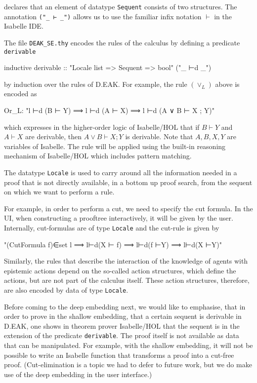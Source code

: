 \documentclass[runningheads,a4paper]{llncs}
\begin{document}
\noindent declares that an element of datatype \texttt{Sequent} consists of two structures. The annotation \texttt{("\_ ⊢ \_")} allows us to use the familiar infix notation $\vdash$ in the Isabelle IDE. 

The file \texttt{DEAK\_SE.thy} encodes the rules of the calculus by defining a predicate \texttt{derivable}

\begin{pyglist}[language = isabelle]
inductive derivable :: "Locale list => Sequent => bool"  ("_ ⊢d _")
\end{pyglist}
\noindent by induction over the rules of D.EAK. For example, the rule $(\vee_L)$ above is encoded as

\begin{pyglist}[language = isabelle]
Or_L:  "l ⊢d (B ⊢ Y) ⟹ l ⊢d (A ⊢ X) ⟹ l ⊢d (A ∨ B ⊢ X ; Y)"
\end{pyglist}
\noindent which expresses in the higher-order logic of Isabelle/HOL that if $B\vdash Y$ and $A\vdash X$ are derivable, then $A\vee B\vdash X;Y$ is derivable.
Note that $A,B,X,Y$ are variables of Isabelle. The rule will be applied using the built-in reasoning mechanism of Isabelle/HOL which includes pattern matching. 

The datatype \texttt{Locale} is used to carry around all the information needed in a proof that is not directly available, in a bottom up proof search, from the sequent on which we want to perform a rule.

For example, in order to perform a cut, we need to specify the cut formula. In the UI, when constructing a prooftree interactively, it will be given by the user. Internally, cut-formulas are of type \texttt{Locale}  and the cut-rule is given by

\begin{pyglist}[language = json]
"(CutFormula f)∈set l ⟹ l⊢d(X ⊢ f) ⟹ l⊢d(f ⊢Y) ⟹ l⊢d(X ⊢Y)"
\end{pyglist}

Similarly, the rules that describe the interaction of the knowledge of agents with epistemic actions depend on the so-called action structures, which define the actions, but are not part of the calculus itself. These action structures, therefore, are also encoded by data of type \texttt{Locale}.

Before coming to the deep embedding next, we would like to emphasise, that in order to prove in the shallow embedding, that a certain sequent is derivable in D.EAK, one shows in theorem prover Isabelle/HOL that the sequent is in the extension of the predicate \texttt{derivable}. The proof itself is not available as data that can be manipulated. For example, with the shallow embedding, it will not be possible to write an Isabelle function that transforms a proof into a cut-free proof. (Cut-elimination is a topic we had to defer to future work, but we do make use of the deep embedding in the user interface.) 
\end{document}
